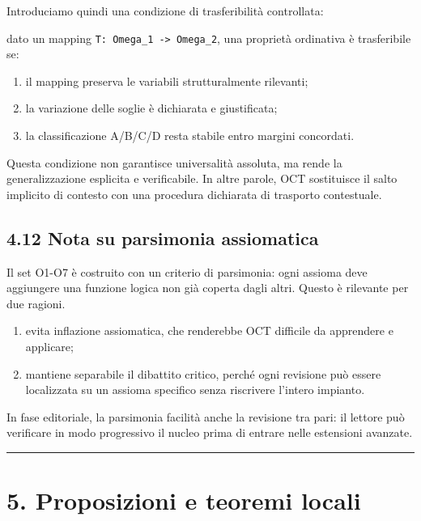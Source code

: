 Introduciamo quindi una condizione di trasferibilità controllata:

dato un mapping \texttt{T:\ Omega\_1\ -\textgreater{}\ Omega\_2}, una proprietà ordinativa è trasferibile se:

\begin{enumerate}
\def\labelenumi{\arabic{enumi}.}
\tightlist
\item
  il mapping preserva le variabili strutturalmente rilevanti;
\item
  la variazione delle soglie è dichiarata e giustificata;
\item
  la classificazione A/B/C/D resta stabile entro margini concordati.
\end{enumerate}

Questa condizione non garantisce universalità assoluta, ma rende la generalizzazione esplicita e verificabile. In altre parole, OCT sostituisce il salto implicito di contesto con una procedura dichiarata di trasporto contestuale.

\subsection{4.12 Nota su parsimonia assiomatica}

Il set O1-O7 è costruito con un criterio di parsimonia: ogni assioma deve aggiungere una funzione logica non già coperta dagli altri. Questo è rilevante per due ragioni.

\begin{enumerate}
\def\labelenumi{\arabic{enumi}.}
\tightlist
\item
  evita inflazione assiomatica, che renderebbe OCT difficile da apprendere e applicare;
\item
  mantiene separabile il dibattito critico, perché ogni revisione può essere localizzata su un assioma specifico senza riscrivere l'intero impianto.
\end{enumerate}

In fase editoriale, la parsimonia facilità anche la revisione tra pari: il lettore può verificare in modo progressivo il nucleo prima di entrare nelle estensioni avanzate.

\begin{center}\rule{0.5\linewidth}{0.5pt}\end{center}

\section{5. Proposizioni e teoremi locali}

